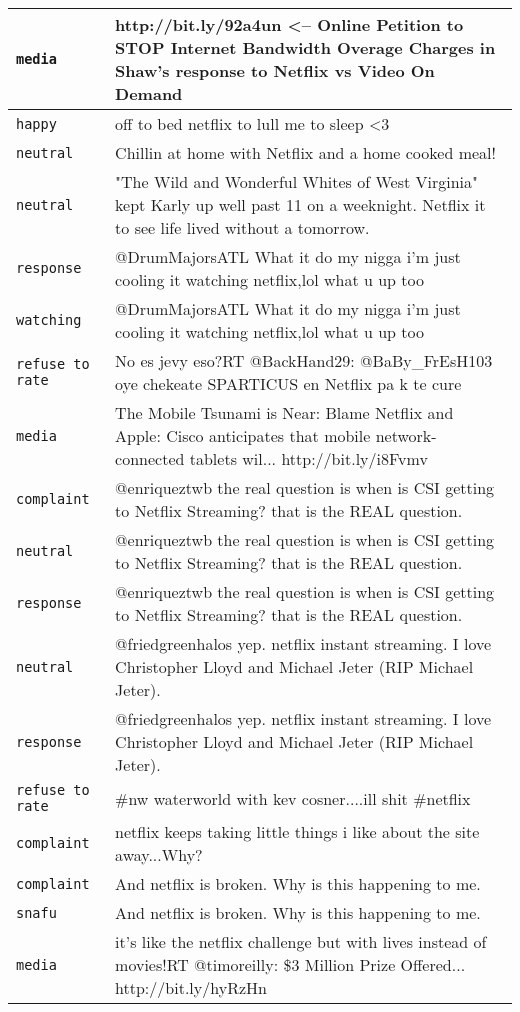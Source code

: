 {\begin{longtable}{|l|p{160mm}|}
      \tabularnewline\hline
         \texttt{media} & http://bit.ly/92a4un <-- Online Petition to STOP Internet Bandwidth Overage Charges in Shaw's response to Netflix vs Video On Demand
      \tabularnewline\hline
         \texttt{happy} & off to bed netflix to lull me to sleep <3
      \tabularnewline\hline
         \texttt{neutral} & Chillin at home with Netflix and a home cooked meal!
      \tabularnewline\hline
         \texttt{neutral} & "The Wild and Wonderful Whites of West Virginia" kept Karly up well past 11 on a weeknight. Netflix it to see life lived without a tomorrow.
      \tabularnewline\hline
         \texttt{response} & @DrumMajorsATL What it do my nigga i'm just cooling it watching netflix,lol what u up too
      \tabularnewline\hline
         \texttt{watching} & @DrumMajorsATL What it do my nigga i'm just cooling it watching netflix,lol what u up too
      \tabularnewline\hline
         \texttt{refuse to rate} & No es jevy eso?RT @BackHand29: @BaBy\_FrEsH103 oye chekeate SPARTICUS en Netflix pa k te cure
      \tabularnewline\hline
         \texttt{media} & The Mobile Tsunami is Near: Blame Netflix and Apple: Cisco anticipates that mobile network-connected tablets wil... http://bit.ly/i8Fvmv
      \tabularnewline\hline
         \texttt{complaint} & @enriqueztwb the real question is when is CSI getting to Netflix Streaming? that is the REAL question.
      \tabularnewline\hline
         \texttt{neutral} & @enriqueztwb the real question is when is CSI getting to Netflix Streaming? that is the REAL question.
      \tabularnewline\hline
         \texttt{response} & @enriqueztwb the real question is when is CSI getting to Netflix Streaming? that is the REAL question.
      \tabularnewline\hline
         \texttt{neutral} & @friedgreenhalos yep. netflix instant streaming. I love Christopher Lloyd and Michael Jeter (RIP Michael Jeter).
      \tabularnewline\hline
         \texttt{response} & @friedgreenhalos yep. netflix instant streaming. I love Christopher Lloyd and Michael Jeter (RIP Michael Jeter).
      \tabularnewline\hline
         \texttt{refuse to rate} & \#nw waterworld with kev cosner....ill shit \#netflix
      \tabularnewline\hline
         \texttt{complaint} & netflix keeps taking little things i like about the site away...Why?
      \tabularnewline\hline
         \texttt{complaint} & And netflix is broken. Why is this happening to me.
      \tabularnewline\hline
         \texttt{snafu} & And netflix is broken. Why is this happening to me.
      \tabularnewline\hline
         \texttt{media} & it's like the netflix challenge but with lives instead of movies!RT @timoreilly: \$3 Million Prize Offered... http://bit.ly/hyRzHn

\end{longtable}}
